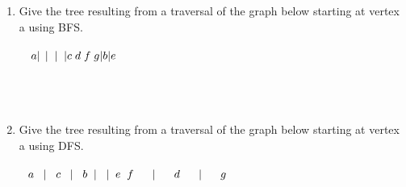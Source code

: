 \documentclass{amsart}
\theoremstyle{definition}
\theoremstyle{Exercise}
\theoremstyle{remark}
\theoremstyle{rule}
\numberwithin{equation}{section}
\begin{document}
\begin{enumerate}[label=(\alph*)]
    \item Give the tree resulting from a traversal of the graph below starting at vertex a using BFS. \\\\
   ${\;\;\;\,     a}\\
    |\;\,  |\;\;  |\;\;  | \\
    c\;  d\;  f\;  g \\
    | \\
    b \\
    | \\
    e $\\\\
    \\
\\
\newpage
\vspace*{0.5in}
    \item Give the tree resulting from a traversal of the graph below starting at vertex a using DFS.\\\\
    ${\,\;\; a}\\
    {\;\;\;|}\\
    {\;\;\;c}\\
    {\;\;\;|}\\
    {\;\;\;b}\\
    {\;\;|\;\;\;|}\\
    {\;\;e\;\;f}\\
    {\;\;\;\;\;\;|}\\
    {\;\;\;\;\;\;d}\\
    {\;\;\;\;\;\;|}\\
    {\;\;\;\;\;\;g}$
    \\\\
\end{enumerate}

\newpage
\vspace*{0.2in}
\end{document}
